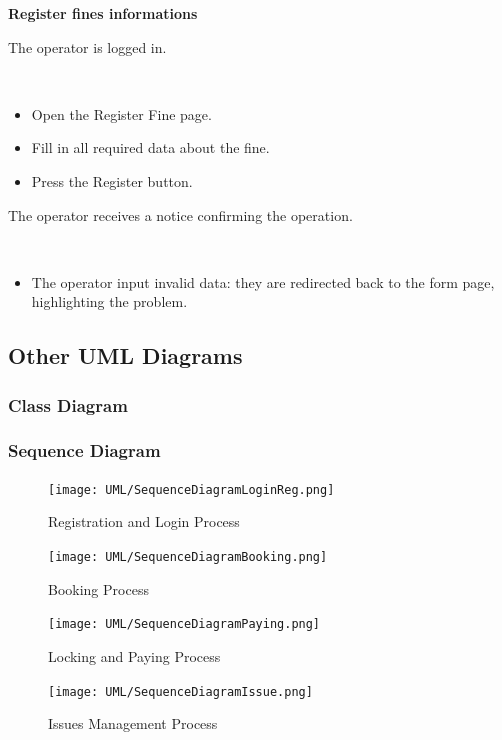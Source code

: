\documentclass[11pt]{article} %
\begin{document}
\begin{description}[noitemsep,topsep=0pt,parsep=0pt,partopsep=0pt]
	\item[Name:] \textbf{Register fines informations}
	\item[Entry Conditions:] The operator is logged in.
	\item[Flow Of Events:] \hfill\
	\begin{itemize}
		\item Open the Register Fine page.
		\item Fill in all required data about the fine.
		\item Press the Register button.
	\end{itemize}
	\item[Exit conditions:]  The operator receives a notice confirming the operation.
	\item[Exceptions:] \hfill\
	\begin{itemize}
		\item The operator input invalid data: they are redirected back to the form page, highlighting the problem.
	\end{itemize}
\end{description}


\subsection{Other UML Diagrams}
\subsubsection{Class Diagram}
\subsubsection{Sequence Diagram}
\begin{figure}[H]
	\centering
	\texttt{[image: UML/SequenceDiagramLoginReg.png]}
	\caption{Registration and Login Process}
\end{figure}
\begin{figure}[H]
	\centering
	\texttt{[image: UML/SequenceDiagramBooking.png]}
	\caption{Booking Process}
\end{figure}
\begin{figure}[H]
	\centering
	\texttt{[image: UML/SequenceDiagramPaying.png]}
	\caption{Locking and Paying Process}
\end{figure}
\begin{figure}[H]
	\centering
	\texttt{[image: UML/SequenceDiagramIssue.png]}
	\caption{Issues Management Process}
\end{figure}
\end{document}
